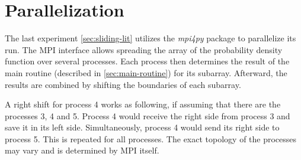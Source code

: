\section{Parallelization}\label{sec:parallelization}
The last experiment \cref{sec:sliding-lit} utilizes the \textit{mpi4py} package to parallelize its run.
The MPI interface allows spreading the array of the probability density function over several processes.
Each process then determines the result of the main routine (described in \cref{sec:main-routine}) for its subarray.
Afterward, the results are combined by shifting the boundaries of each subarray.
\newline

A right shift for process 4 works as following, if assuming that there are the processes 3, 4 and 5.
Process 4 would receive the right side from process 3 and save it in its left side.
Simultaneously, process 4 would send its right side to process 5.
This is repeated for all processes.
The exact topology of the processes may vary and is determined by MPI itself.
